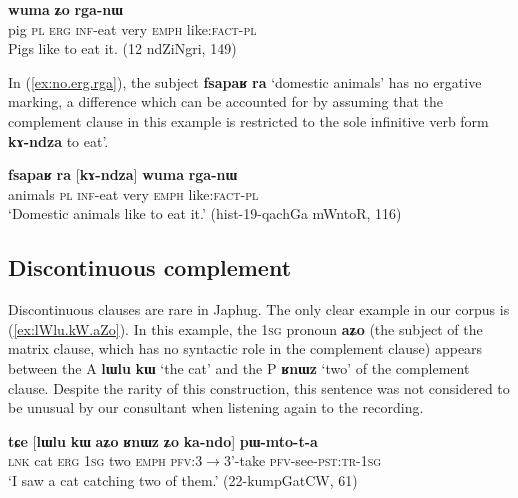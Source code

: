 \documentclass[oneside,a4paper,11pt]{article}
\newcommand{\ipa}[1]{\textbf{\phon#1}} %
\begin{document}
\begin{exe}
\ex \label{ex:erg.rga}
\gll
[\ipa{paʁ}  	\ipa{ra}  	\ipa{kɯ}  	\ipa{kɤ-ndza}]  	\ipa{wuma}  	\ipa{ʑo}  	\ipa{rga-nɯ}  \\
pig \textsc{pl} \textsc{erg} \textsc{inf}-eat very \textsc{emph}  like:\textsc{fact}-\textsc{pl} \\
 \glt Pigs like to eat it. (12 ndZiNgri, 149)
\end{exe}

In (\ref{ex:no.erg.rga}), the subject \ipa{fsapaʁ} 	\ipa{ra} `domestic animals' has no ergative marking, a difference which can be accounted for by assuming that the  complement clause in this example is restricted to the sole infinitive verb form \ipa{kɤ-ndza}   to eat'.

\begin{exe}
\ex \label{ex:no.erg.rga}
\gll \ipa{fsapaʁ} 	\ipa{ra} 	[\ipa{kɤ-ndza}] 	\ipa{wuma} 	\ipa{rga-nɯ}  \\
animals \textsc{pl}  \textsc{inf}-eat very \textsc{emph}  like:\textsc{fact}-\textsc{pl} \\
\glt `Domestic animals like to eat it.' (hist-19-qachGa mWntoR, 116)
\end{exe}
 

\subsection{Discontinuous complement} 

Discontinuous clauses are rare in Japhug. The only clear example in our corpus is (\ref{ex:lWlu.kW.aZo}). In this example, the \textsc{1sg} pronoun \ipa{aʑo} (the subject of the matrix clause, which has no syntactic role in the complement clause) appears between the A \ipa{lɯlu} 	\ipa{kɯ} `the cat' and the P \ipa{ʁnɯz} `two' of the complement clause. Despite the rarity of this construction, this sentence was not considered to be unusual by our consultant when listening again to the recording.
 
 \begin{exe}
\ex \label{ex:lWlu.kW.aZo}
\gll \ipa{tɕe} 	[\ipa{lɯlu} 	\ipa{kɯ} 	\ipa{aʑo} 	\ipa{ʁnɯz} 	\ipa{ʑo} 	\ipa{ka-ndo}] 	\ipa{pɯ-mto-t-a} \\
\textsc{lnk} cat \textsc{erg} \textsc{1sg} two \textsc{emph} \textsc{pfv}:3$\rightarrow$3'-take \textsc{pfv}-see-\textsc{pst:tr-1sg} \\
\glt `I saw a cat catching two of them.' (22-kumpGatCW, 61)
\end{exe}
 
\end{document}
